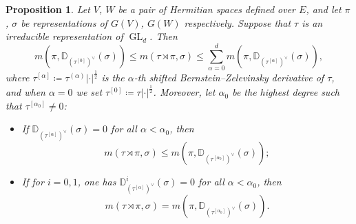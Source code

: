 \documentclass[11pt,letterpaper]{amsart}
\theoremstyle{plain}
\newcounter{theorem}[section]
\numberwithin{theorem}{section}
\numberwithin{equation}{subsection}
\newtheorem{Prop}[theorem]{Proposition}
\theoremstyle{remark}
\newcommand{\GL}{\operatorname{GL}}
\newcommand{\D}{\mathbb{D}}
\begin{document}
\begin{Prop}\label{P:Frobenius-MackeyInequality}
Let $V$, $W$ be a pair of Hermitian spaces defined over $E$, and let $\pi$, $\sigma$ be representations of $G\left(V\right)$, $G\left(W\right)$ respectively. Suppose that $\tau$ is an irreducible representation of $\GL_d$. Then
\[
    m\left(\pi,\D_{\left( \tau^{[0]}\right)^\vee}\left(\sigma\right)\right)\leq m\left(\tau\rtimes\pi,\sigma\right)\leq \sum_{\alpha=0}^d m\left(\pi,\D_{\left(\tau^{[\alpha]}\right)^\vee}\left(\sigma\right)\right),
\]
where $\tau^{[\alpha]}\coloneqq\tau^{(\alpha)}|\cdot|^{\frac{1}{2}}$ is the $\alpha$-th shifted Bernstein--Zelevinsky derivative of $\tau$, and when $\alpha=0$ we set $\tau^{[0]}\coloneqq \tau|\cdot|^{\frac{1}{2}}$. Moreover, let $\alpha_0$ be the highest degree such that $\tau^{[\alpha_0]}\neq 0$:
\begin{itemize}
    \item If $\D_{\left(\tau^{[\alpha]}\right)^\vee}\left(\sigma\right)=0$ for all $\alpha<\alpha_0$, then 
    \[
        m\left(\tau\rtimes\pi,\sigma\right) \leq m\left(\pi,\D_{\left(\tau^{[\alpha_0]}\right)^\vee}\left(\sigma\right)\right);
    \]

    \vskip 5pt

    \item If for $i=0,1$, one has $\D^i_{\left(\tau^{[\alpha]}\right)^\vee}\left(\sigma\right)=0$ for all $\alpha<\alpha_0$, then
    \[
        m\left(\tau\rtimes\pi,\sigma\right) = m\left(\pi,\D_{\left(\tau^{[\alpha_0]}\right)^\vee}\left(\sigma\right)\right).
    \]
\end{itemize}
\end{Prop} 

\vskip 5pt
\end{document}
